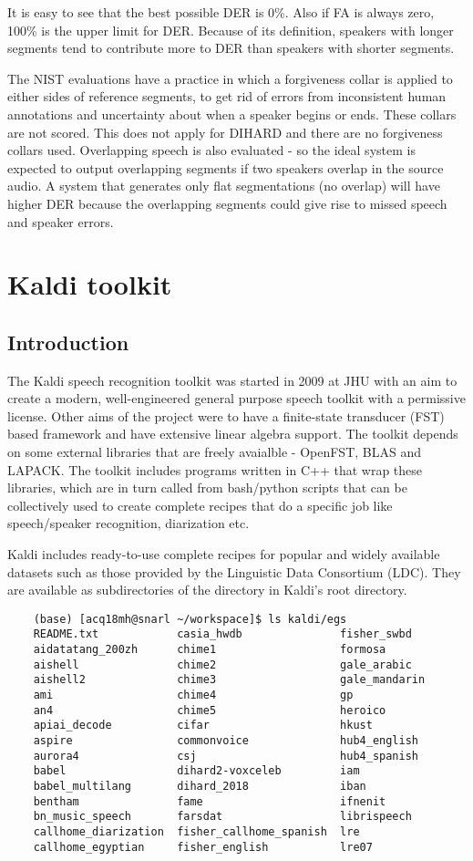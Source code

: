 		It is easy to see that the best possible DER is 0\%. Also if FA is always zero, 100\% is the upper limit for DER. Because of its definition, speakers with longer segments tend to contribute more to DER than speakers with shorter segments.
		
		The NIST evaluations have a practice in which a forgiveness collar is applied to either sides of reference segments, to get rid of errors from inconsistent human annotations and uncertainty about when a speaker begins or ends. These collars are not scored. This does not apply for DIHARD and there are no forgiveness collars used. Overlapping speech is also evaluated - so the ideal system is expected to output overlapping segments if two speakers overlap in the source audio. A system that generates only flat segmentations (no overlap) will have higher DER because the overlapping segments could give rise to missed speech and speaker errors.

\section{Kaldi toolkit}
	\subsection{Introduction}
	The Kaldi speech recognition toolkit was started in 2009 at JHU with an aim to create a modern, well-engineered general purpose speech toolkit with a permissive license. Other aims of the project were to have a finite-state transducer (FST) based framework and have extensive linear algebra support. The toolkit depends on some external libraries that are freely avaialble - OpenFST, BLAS and LAPACK. The toolkit includes programs written in C++ that wrap these libraries, which are in turn called from bash/python scripts that can be collectively used to create complete recipes that do a specific job like speech/speaker recognition, diarization etc.
	
	
	Kaldi includes ready-to-use complete recipes for popular and widely available datasets such as those provided by the Linguistic Data Consortium (LDC). They are available as subdirectories of the  directory in Kaldi's root directory.
	
	\begin{verbatim}
	(base) [acq18mh@snarl ~/workspace]$ ls kaldi/egs
	README.txt            casia_hwdb               fisher_swbd
	aidatatang_200zh      chime1                   formosa
	aishell               chime2                   gale_arabic
	aishell2              chime3                   gale_mandarin
	ami                   chime4                   gp
	an4                   chime5                   heroico
	apiai_decode          cifar                    hkust
	aspire                commonvoice              hub4_english
	aurora4               csj                      hub4_spanish
	babel                 dihard2-voxceleb         iam
	babel_multilang       dihard_2018              iban
	bentham               fame                     ifnenit
	bn_music_speech       farsdat                  librispeech
	callhome_diarization  fisher_callhome_spanish  lre
	callhome_egyptian     fisher_english           lre07
	\end{verbatim}
	
